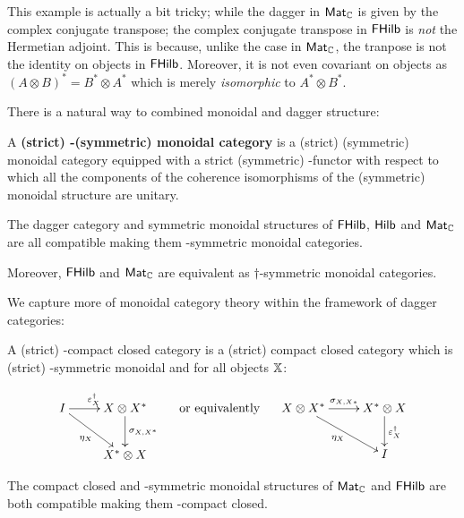 This example is actually a bit tricky; while the dagger in $\mathsf{Mat}_{\mathbb{C}}$ is given by the complex conjugate transpose; the complex conjugate transpose in $\mathsf{FHilb}$ is {\em not } the Hermetian adjoint.  This is because, unlike the case in $\mathsf{Mat}_{\mathbb{C}}$, the tranpose is not the identity on objects in $\mathsf{FHilb}$.  Moreover, it is not even covariant on objects as  $(A\otimes B)^* = B^*\otimes A^*$ which is merely {\em isomorphic} to  $A^*\otimes B^*$.





There is a natural way to combined monoidal and dagger structure:

\begin{definition}
A {\bf  (strict) \dag-(symmetric) monoidal category} is a (strict) (symmetric) monoidal category equipped with a strict (symmetric) \dag-functor with respect to which all the components of the  coherence isomorphisms of the (symmetric) monoidal structure are unitary.
\end{definition}



\begin{example}
The dagger category and symmetric monoidal structures of $\mathsf{FHilb}$, $\mathsf{Hilb}$ and $\mathsf{Mat}_{\mathbb{C}}$ are all compatible making them \dag-symmetric monoidal categories.

Moreover, $\mathsf{FHilb}$ and $\mathsf{Mat}_{\mathbb{C}}$  are equivalent as $\dag$-symmetric monoidal categories.
\end{example}


We capture more of monoidal category theory within the framework of dagger categories:

\begin{definition}
A {(strict) \dag-compact closed category} is a (strict) compact closed category which is (strict) \dag-symmetric monoidal and for all objects $\mathbb{X}$:

$$
\xymatrix{
I \ar[r]^{\epsilon_X^\dag} \ar[dr]_{\eta_X}   &  X\otimes X^* \ar[d]^{\sigma_{X,X^*}}\\
 &  X^* \otimes X 
}
\hspace*{.5cm}
\text{or equivalently}
\hspace*{.5cm}
\xymatrix{
X\otimes X^* \ar[dr]_{\eta_X} \ar[r]^{\sigma_{X,X*}}
 & X^* \otimes X  \ar[d]^{\epsilon_X^\dag}\\
& I
}
$$
\end{definition}

\begin{example}
The compact closed and \dag-symmetric monoidal structures of $\mathsf{Mat}_{\mathbb{C}}$ and $\mathsf{FHilb}$ are both compatible making them \dag-compact closed.
\end{example}

